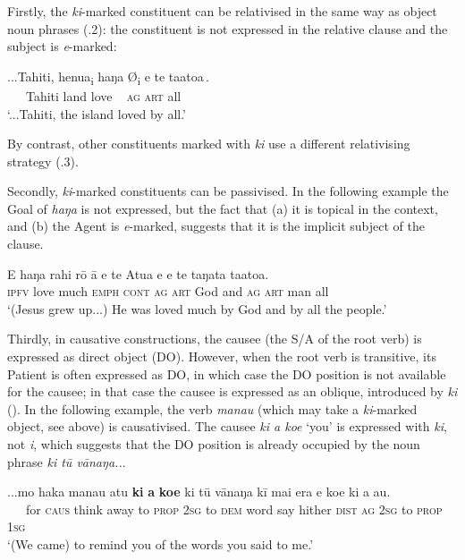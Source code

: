 Firstly, the \textit{ki}{}-marked constituent can be relativised in the same way as object noun phrases (.2): the constituent is not expressed in the relative clause and the subject is \textit{e}{}-marked:

\ea\label{ex:8.127}
\gll ...Tahiti, henua\textsubscript{\textup{i}} {\ob}haŋa \textup{Ø\textsubscript{i}} e te ta{\ꞌ}ato{\ꞌ}a\,{\cb}. \\
 ~~~Tahiti land  {\db}love ~ \textsc{ag} \textsc{art} all \\

\glt
‘...Tahiti, the island loved by all.’ \textstyleExampleref{[R303.019]} 
\z

By contrast, other constituents marked with \textit{ki} use a different relativising strategy (.3).

Secondly, \textit{ki}{}-marked constituents can be passivised. In the following example the Goal of \textit{haŋa} is not expressed, but the fact that (a) it is topical in the context, and (b) the Agent is \textit{e}{}-marked, suggests that it is the implicit subject of the clause.

\ea\label{ex:8.128}
\gll E haŋa rahi rō {\ꞌ}ā e te {\ꞌ}Atua {\ꞌ}e e te taŋata ta{\ꞌ}ato{\ꞌ}a. \\
\textsc{ipfv} love much \textsc{emph} \textsc{cont} \textsc{ag} \textsc{art} God and \textsc{ag} \textsc{art} man all \\

\glt
‘(Jesus grew up...) He was loved much by God and by all the people.’ \textstyleExampleref{[Luke 2:52]}
\z

Thirdly, in causative constructions, the causee (the S/A of the root verb) is expressed as direct object (DO). However, when the root verb is transitive, its Patient is often expressed as DO, in which case the DO position is not available for the causee; in that case the causee is expressed as an oblique, introduced by \textit{ki} (). In the following example, the verb \textit{mana{\ꞌ}u} (which may take a \textit{ki}{}-marked object, see  above) is causativised. The causee \textit{ki a koe} ‘you’ is expressed with \textit{ki}, not \textit{i}, which suggests that the DO position is already occupied by the noun phrase \textit{ki tū vānaŋa..}. 

\ea\label{ex:8.129}
\gll ...mo haka mana{\ꞌ}u atu \textbf{ki} \textbf{a} \textbf{koe} ki tū vānaŋa kī mai era e koe ki a au.\\
~~~for \textsc{caus} think away to \textsc{prop} \textsc{2sg} to \textsc{dem} word say hither \textsc{dist} \textsc{ag} \textsc{2sg} to \textsc{prop} \textsc{1sg}\\
\glt
‘(We came) to remind you of the words you said to me.’ \textstyleExampleref{[R229.207]}  
\z

